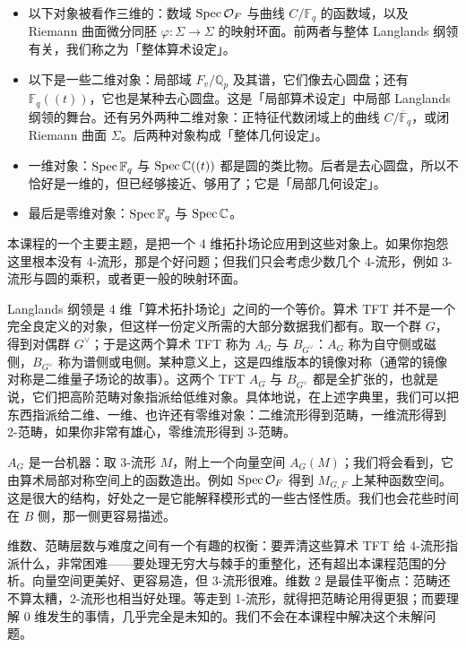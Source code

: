 \begin{itemize}
  \item 以下对象被看作三维的：数域 $\operatorname{Spec}\mathcal{O}_F$ 与曲线 $C/\mathbb{F}_q$ 的函数域，以及 Riemann 曲面微分同胚 $\varphi:\Sigma\to\Sigma$ 的映射环面。前两者与整体 Langlands 纲领有关，我们称之为「整体算术设定」。
  \item 以下是一些二维对象：局部域 $F_v/\mathbb{Q}_p$ 及其谱，它们像去心圆盘；还有 $\mathbb{F}_q((t))$，它也是某种去心圆盘。这是「局部算术设定」中局部 Langlands 纲领的舞台。还有另外两种二维对象：正特征代数闭域上的曲线 $C/\overline{\mathbb{F}}_q$，或闭 Riemann 曲面 $\Sigma$。后两种对象构成「整体几何设定」。
  \item 一维对象：$\operatorname{Spec}\mathbb{F}_q$ 与 $\operatorname{Spec}\mathbb{C}((t))$ 都是圆的类比物。后者是去心圆盘，所以不恰好是一维的，但已经够接近、够用了；它是「局部几何设定」。
  \item 最后是零维对象：$\operatorname{Spec}\mathbb{F}_q$ 与 $\operatorname{Spec}\mathbb{C}$。
\end{itemize}

本课程的一个主要主题，是把一个 4 维拓扑场论应用到这些对象上。如果你抱怨这里根本没有 4-流形，那是个好问题；但我们只会考虑少数几个 4-流形，例如 3-流形与圆的乘积，或者更一般的映射环面。

Langlands 纲领是 4 维「算术拓扑场论」之间的一个等价。算术 TFT 并不是一个完全良定义的对象，但这样一份定义所需的大部分数据我们都有。取一个群 $G$，得到对偶群 $G^\vee$；于是这两个算术 TFT 称为 $A_G$ 与 $B_{G^\vee}$：$A_G$ 称为自守侧或磁侧，$B_{G^\vee}$ 称为谱侧或电侧。某种意义上，这是四维版本的镜像对称（通常的镜像对称是二维量子场论的故事）。这两个 TFT $A_G$ 与 $B_{G^\vee}$ 都是全扩张的，也就是说，它们把高阶范畴对象指派给低维对象。具体地说，在上述字典里，我们可以把东西指派给二维、一维、也许还有零维对象：二维流形得到范畴，一维流形得到 2-范畴，如果你非常有雄心，零维流形得到 3-范畴。

$A_G$ 是一台机器：取 3-流形 $M$，附上一个向量空间 $A_G(M)$；我们将会看到，它由算术局部对称空间上的函数造出。例如 $\operatorname{Spec}\mathcal{O}_F$ 得到 $M_{G,F}$ 上某种函数空间。这是很大的结构，好处之一是它能解释模形式的一些古怪性质。我们也会花些时间在 $B$ 侧，那一侧更容易描述。

维数、范畴层数与难度之间有一个有趣的权衡：要弄清这些算术 TFT 给 4-流形指派什么，非常困难——要处理无穷大与棘手的重整化，还有超出本课程范围的分析。向量空间更美好、更容易造，但 3-流形很难。维数 2 是最佳平衡点：范畴还不算太糟，2-流形也相当好处理。等走到 1-流形，就得把范畴论用得更狠；而要理解 0 维发生的事情，几乎完全是未知的。我们不会在本课程中解决这个未解问题。

